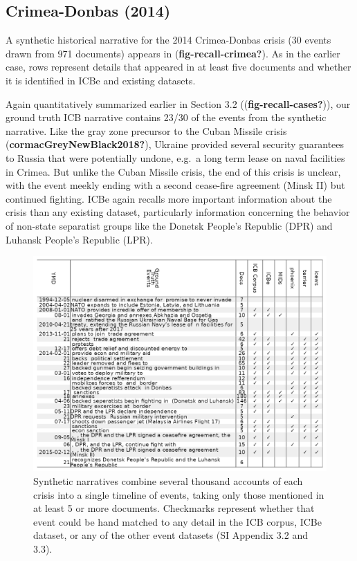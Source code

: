 \documentclass{article}
\begin{document}
\hypertarget{crimea-donbas-2014}{%
\subsection{Crimea-Donbas (2014)}\label{crimea-donbas-2014}}

A synthetic historical narrative for the 2014 Crimea-Donbas crisis (30
events drawn from 971 documents) appears in
(\textbf{fig-recall-crimea?}). As in the earlier case, rows represent
details that appeared in at least five documents and whether it is
identified in ICBe and existing datasets.

Again quantitatively summarized earlier in Section 3.2
((\textbf{fig-recall-cases?})), our ground truth ICB narrative contains
23/30 of the events from the synthetic narrative. Like the gray zone
precursor to the Cuban Missile crisis
(\textbf{cormacGreyNewBlack2018?}), Ukraine provided several security
guarantees to Russia that were potentially undone, e.g.~a long term
lease on naval facilities in Crimea. But unlike the Cuban Missile
crisis, the end of this crisis is unclear, with the event meekly ending
with a second cease-fire agreement (Minsk II) but continued fighting.
ICBe again recalls more important information about the crisis than any
existing dataset, particularly information concerning the behavior of
non-state separatist groups like the Donetsk People's Republic (DPR) and
Luhansk People's Republic (LPR).

\begin{figure}
\hypertarget{fig-recall-crimea}{%
\centering
\includegraphics{case_study_crimea_recall.png}
\caption{Synthetic narratives combine several thousand accounts of each
crisis into a single timeline of events, taking only those mentioned in
at least 5 or more documents. Checkmarks represent whether that event
could be hand matched to any detail in the ICB corpus, ICBe dataset, or
any of the other event datasets (SI Appendix 3.2 and
3.3).}\label{fig-recall-crimea}
}
\end{figure}
\end{document}
